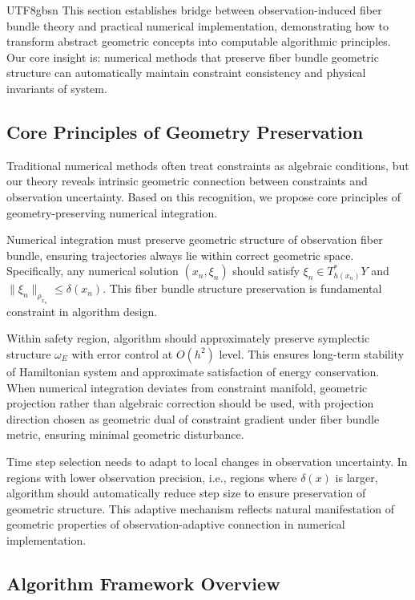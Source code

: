 \documentclass[a4paper,12pt]{extarticle}
\theoremstyle{definition}
\begin{document}
\begin{CJK}{UTF8}{gbsn}
This section establishes bridge between observation-induced fiber bundle theory and practical numerical implementation, demonstrating how to transform abstract geometric concepts into computable algorithmic principles. Our core insight is: numerical methods that preserve fiber bundle geometric structure can automatically maintain constraint consistency and physical invariants of system.

\subsection{Core Principles of Geometry Preservation}
\label{subsec:geometric_principles}

Traditional numerical methods often treat constraints as algebraic conditions, but our theory reveals intrinsic geometric connection between constraints and observation uncertainty. Based on this recognition, we propose core principles of geometry-preserving numerical integration.

Numerical integration must preserve geometric structure of observation fiber bundle, ensuring trajectories always lie within correct geometric space. Specifically, any numerical solution $(x_n, \xi_n)$ should satisfy $\xi_n \in T^*_{h(x_n)}Y$ and $\|\xi_n\|_{\rho_{x_n}} \leq \delta(x_n)$. This fiber bundle structure preservation is fundamental constraint in algorithm design.

Within safety region, algorithm should approximately preserve symplectic structure $\omega_E$ with error control at $O(h^2)$ level. This ensures long-term stability of Hamiltonian system and approximate satisfaction of energy conservation. When numerical integration deviates from constraint manifold, geometric projection rather than algebraic correction should be used, with projection direction chosen as geometric dual of constraint gradient under fiber bundle metric, ensuring minimal geometric disturbance.

Time step selection needs to adapt to local changes in observation uncertainty. In regions with lower observation precision, i.e., regions where $\delta(x)$ is larger, algorithm should automatically reduce step size to ensure preservation of geometric structure. This adaptive mechanism reflects natural manifestation of geometric properties of observation-adaptive connection in numerical implementation.

\subsection{Algorithm Framework Overview}
\label{subsec:algorithm_overview}


\end{CJK}
\end{document}
